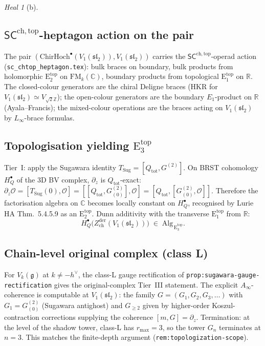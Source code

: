 \documentclass{article}
\theoremstyle{definition}
\theoremstyle{remark}
\newtheorem{heal}[theorem]{Heal}
\newcommand{\SCchtop}{\mathsf{SC}^{\mathrm{ch,top}}}
\newcommand{\Zder}{Z^{\mathrm{der}}_{\mathrm{ch}}}
\newcommand{\ChirHoch}{\mathrm{ChirHoch}}
\newcommand{\Etop}[1]{\mathrm{E}_{#1}^{\mathrm{top}}}
\newcommand{\fg}{\mathfrak{g}}
\begin{document}
\begin{heal}[b]
\subsection{$\SCchtop$-heptagon action on the pair}
The pair $(\ChirHoch^\bullet(V_1(\mathfrak{sl}_2)),
V_1(\mathfrak{sl}_2))$ carries the $\SCchtop$-operad
action (\texttt{sc\_chtop\_heptagon.tex}): bulk braces
on boundary, bulk products from holomorphic $\Etop{2}$ on
$\mathrm{FM}_k(\mathbb{C})$, boundary products from
topological $\Etop{1}$ on $\mathbb{R}$. The closed-colour
generators are the chiral Deligne braces (HKR for
$V_1(\mathfrak{sl}_2) \simeq V_{\sqrt{2}\mathbb{Z}}$); the
open-colour generators are the boundary $E_1$-product on
$\mathbb{R}$ (Ayala--Francis); the mixed-colour operations
are the braces acting on $V_1(\mathfrak{sl}_2)$ by
$L_\infty$-brace formulas.

\subsection{Topologisation yielding $\Etop{3}$}
Tier~I: apply the Sugawara identity
$T_{\mathrm{Sug}} = [Q_{\mathrm{tot}}, G^{(2)}]$.
On BRST cohomology $H^\bullet_Q$ of the 3D BV complex,
$\partial_z$ is $Q_{\mathrm{tot}}$-exact:
$\partial_z \mathcal{O} =
[T_{\mathrm{Sug}}(0), \mathcal{O}] =
[[Q_{\mathrm{tot}}, G^{(2)}_{(0)}], \mathcal{O}] =
[Q_{\mathrm{tot}}, [G^{(2)}_{(0)}, \mathcal{O}]]$.
Therefore the factorisation algebra on $\mathbb{C}$
becomes locally constant on $H^\bullet_Q$, recognised
by Lurie HA Thm.~5.4.5.9 as an $\Etop{2}$. Dunn additivity
with the transverse $\Etop{1}$ from $\mathbb{R}$:
\begin{equation}
  H^\bullet_Q\bigl(\Zder(V_1(\mathfrak{sl}_2))\bigr)
  \;\in\; \mathrm{Alg}_{\,\Etop{3}}.
\end{equation}

\subsection{Chain-level original complex (class L)}
For $V_k(\fg)$ at $k \neq -h^\vee$, the class-L gauge
rectification of
\texttt{prop:sugawara-gauge-rectification} gives the
original-complex Tier~III statement. The explicit
$A_\infty$-coherence is computable at $V_1(\mathfrak{sl}_2)$:
the family $G = (G_1, G_2, G_3, \ldots)$ with
$G_1 = G^{(2)}_{(0)}$ (Sugawara antighost) and
$G_{\ge 2}$ given by higher-order Koszul-contraction
corrections supplying the coherence
$[m, G] = \partial_z$. Termination: at the level of
the shadow tower, class-L has $r_{\max} = 3$, so the
tower $G_n$ terminates at $n = 3$. This matches the
finite-depth argument
(\texttt{rem:topologization-scope}).


\end{heal}
\end{document}
